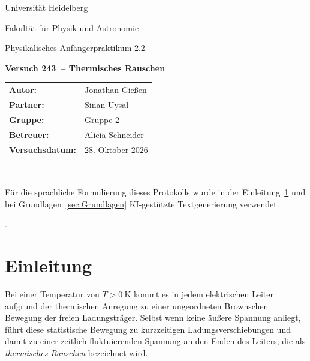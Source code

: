 \documentclass[12pt,a4paper,titlepage]{scrartcl}
\numberwithin{equation}{section}
\numberwithin{table}{section}
\numberwithin{figure}{section}
\newcommand{\versuch}{Versuch 243}
\newcommand{\titel}{Thermisches Rauschen}
\newcommand{\praktikum}{Physikalisches Anfängerpraktikum 2.2}
\newcommand{\autor}{Jonathan Gießen}
\newcommand{\partner}{Sinan Uysal}
\newcommand{\gruppe}{Gruppe 2}
\newcommand{\datum}{28. Oktober 2026}
\newcommand{\betreuer}{Alicia Schneider}
\begin{document}
\pagestyle{scrheadings}

\begin{titlepage}



    \centering
    \vspace*{4cm}
    {\large Universität Heidelberg\par}
    {\small Fakultät für Physik und Astronomie\par}
    {\Large \praktikum\par}
    \vspace{0.8cm}
    {\LARGE \bfseries \versuch\ -- \titel\par}
    \vspace{1.5cm}

    \begin{tabular}{ll}
        \textbf{Autor:} & \autor\\
        \textbf{Partner:} & \partner\\
        \textbf{Gruppe:} & \gruppe\\
        \textbf{Betreuer:} & \betreuer\\
        \textbf{Versuchsdatum:} & \datum\\
    \end{tabular}

    \vfill
    \hrulefill\
\end{titlepage}

\tableofcontents

\bigskip
\begin{tcolorbox}[colback=gray!5,colframe=gray!60,boxrule=0.8pt,arc=0.01mm,title=KI-Hinweis]
    Für die sprachliche Formulierung dieses Protokolls wurde in der Einleitung~\ref{sec:Einleitung} und bei Grundlagen~\ref{sec:Grundlagen} KI-gestützte Textgenerierung verwendet. 
\end{tcolorbox}.

\clearpage


\section{Einleitung}\label{sec:Einleitung}
Bei einer Temperatur von $T > \SI{0}{\kelvin}$ kommt es in jedem elektrischen Leiter aufgrund der thermischen Anregung zu einer ungeordneten Brownschen Bewegung der freien Ladungsträger. Selbst wenn keine äußere Spannung anliegt, führt diese statistische Bewegung zu kurzzeitigen Ladungsverschiebungen und damit zu einer zeitlich fluktuierenden Spannung an den Enden des Leiters, die als \emph{thermisches Rauschen} bezeichnet wird.
\end{document}
